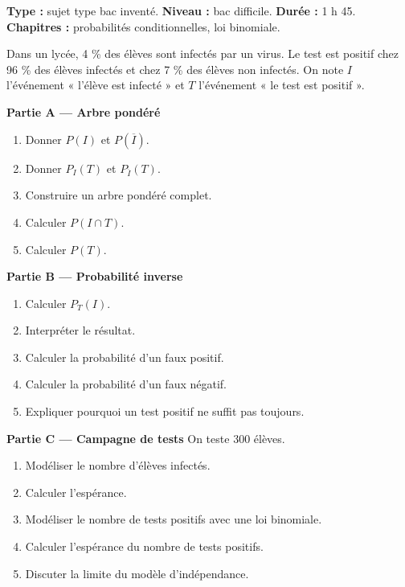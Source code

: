 \documentclass[11pt,a4paper]{article}
\begin{document}
\hypertarget{M-LONG-03}{}
\begin{sujettype}
\textbf{Type :} sujet type bac inventé.  
\textbf{Niveau :} bac difficile.  
\textbf{Durée :} 1 h 45.  
\textbf{Chapitres :} probabilités conditionnelles, loi binomiale.

Dans un lycée, 4 \% des élèves sont infectés par un virus. Le test est positif chez 96 \% des élèves infectés et chez 7 \% des élèves non infectés. On note $I$ l'événement « l'élève est infecté » et $T$ l'événement « le test est positif ».

\textbf{Partie A — Arbre pondéré}
\begin{enumerate}
  \item Donner $P(I)$ et $P(\overline I)$.
  \item Donner $P_I(T)$ et $P_{\overline I}(T)$.
  \item Construire un arbre pondéré complet.
  \item Calculer $P(I\cap T)$.
  \item Calculer $P(T)$.
\end{enumerate}

\textbf{Partie B — Probabilité inverse}
\begin{enumerate}
  \item Calculer $P_T(I)$.
  \item Interpréter le résultat.
  \item Calculer la probabilité d'un faux positif.
  \item Calculer la probabilité d'un faux négatif.
  \item Expliquer pourquoi un test positif ne suffit pas toujours.
\end{enumerate}

\textbf{Partie C — Campagne de tests}
On teste 300 élèves.
\begin{enumerate}
  \item Modéliser le nombre d'élèves infectés.
  \item Calculer l'espérance.
  \item Modéliser le nombre de tests positifs avec une loi binomiale.
  \item Calculer l'espérance du nombre de tests positifs.
  \item Discuter la limite du modèle d'indépendance.
\end{enumerate}
\end{sujettype}
\end{document}
